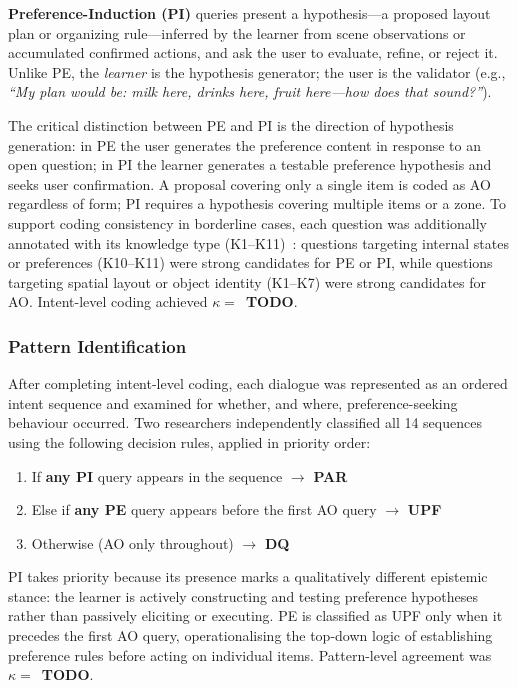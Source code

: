 \documentclass[manuscript,review,anonymous]{acmart}
\begin{document}
\textbf{Preference-Induction (PI)} queries present a hypothesis---a proposed layout plan or organizing rule---inferred by the learner from scene observations or accumulated confirmed actions, and ask the user to evaluate, refine, or reject it. Unlike PE, the \textit{learner} is the hypothesis generator; the user is the validator (e.g., \textit{``My plan would be: milk here, drinks here, fruit here---how does that sound?''}).

The critical distinction between PE and PI is the direction of hypothesis generation: in PE the user generates the preference content in response to an open question; in PI the learner generates a testable preference hypothesis and seeks user confirmation. A proposal covering only a single item is coded as AO regardless of form; PI requires a hypothesis covering multiple items or a zone. To support coding consistency in borderline cases, each question was additionally annotated with its knowledge type (K1--K11)~\cite{shin2023uncertainty}: questions targeting internal states or preferences (K10--K11) were strong candidates for PE or PI, while questions targeting spatial layout or object identity (K1--K7) were strong candidates for AO. Intent-level coding achieved $\kappa = $~\textbf{TODO}.

\subsubsection{Pattern Identification}

After completing intent-level coding, each dialogue was represented as an ordered intent sequence and examined for whether, and where, preference-seeking behaviour occurred. Two researchers independently classified all 14 sequences using the following decision rules, applied in priority order:

\begin{enumerate}
    \item If \textbf{any PI} query appears in the sequence $\rightarrow$ \textbf{PAR}
    \item Else if \textbf{any PE} query appears before the first AO query $\rightarrow$ \textbf{UPF}
    \item Otherwise (AO only throughout) $\rightarrow$ \textbf{DQ}
\end{enumerate}

PI takes priority because its presence marks a qualitatively different epistemic stance: the learner is actively constructing and testing preference hypotheses rather than passively eliciting or executing. PE is classified as UPF only when it precedes the first AO query, operationalising the top-down logic of establishing preference rules before acting on individual items. Pattern-level agreement was $\kappa = $~\textbf{TODO}.
\end{document}
